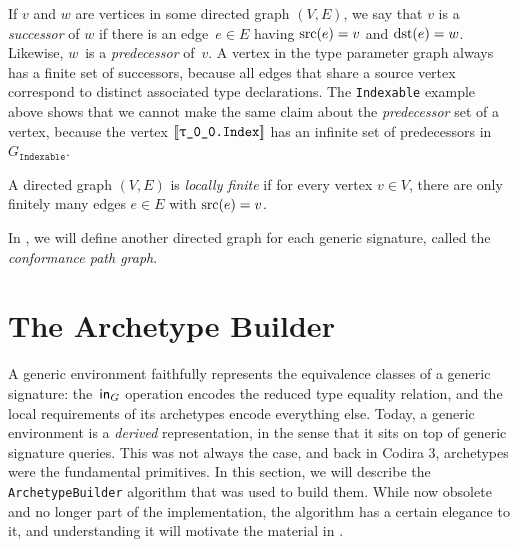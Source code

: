 \documentclass[../generics]{subfiles}
\begin{document}
If $v$ and $w$ are vertices in some directed graph $(V, E)$, we say that $v$ is a \emph{successor} of $w$ if there is an edge~$e\in E$ having $\operatorname{src}(e)=v$ and $\operatorname{dst}(e)=w$. Likewise, $w$~is a \emph{predecessor} of~$v$. A vertex in the type parameter graph always has a finite set of successors, because all edges that share a source vertex correspond to distinct associated type declarations. The \texttt{Indexable} example above shows that we cannot make the same claim about the \emph{predecessor} set of a vertex, because the vertex $\archetype{\rT.Index}$ has an infinite set of predecessors in $G_\texttt{Indexable}$.

\begin{definition}\label{locally finite def}
A directed graph $(V,E)$ is \emph{locally finite} if for every vertex $v\in V$, there are only finitely many edges $e\in E$ with $\operatorname{src}(e)=v$.
\end{definition}

In , we will define another directed graph for each generic signature, called the \emph{conformance path graph}.

\section{The Archetype Builder}\label{archetype builder}

A generic environment faithfully represents the equivalence classes of a generic signature: the~$\mathsf{in}_G$ operation encodes the reduced type equality relation, and the local requirements of its archetypes encode everything else. Today, a generic environment is a \emph{derived} representation, in the sense that it sits on top of generic signature queries. This was not always the case, and back in Codira 3, archetypes were the fundamental primitives. In this section, we will describe the \texttt{ArchetypeBuilder} algorithm that was used to build them. While now obsolete and no longer part of the implementation, the algorithm has a certain elegance to it, and understanding it will motivate the material in .
\end{document}
